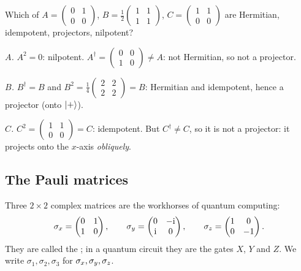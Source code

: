 \begin{example}\label{ex:special}
  Which of $A=\begin{pmatrix}0&1\\0&0\end{pmatrix}$, $B=\tfrac12\begin{pmatrix}1&1\\1&1\end{pmatrix}$, $C=\begin{pmatrix}1&1\\0&0\end{pmatrix}$ are Hermitian, idempotent, projectors, nilpotent?
\end{example}
\begin{solution}
  \begin{steps}
    \item \emph{$A$.} $A^2=0$: nilpotent. $A^\dagger=\begin{pmatrix}0&0\\1&0\end{pmatrix}\neq A$: not Hermitian, so not a projector.
    \item \emph{$B$.} $B^\dagger=B$ and $B^2=\tfrac14\begin{pmatrix}2&2\\2&2\end{pmatrix}=B$: Hermitian and idempotent, hence a projector (onto $\left|+\right\rangle$).
    \item \emph{$C$.} $C^2=\begin{pmatrix}1&1\\0&0\end{pmatrix}=C$: idempotent. But $C^\dagger\neq C$, so it is not a projector: it projects onto the $x$-axis \emph{obliquely}.
  \end{steps}
\end{solution}

\subsection{The Pauli matrices}

Three $2\times2$ complex matrices are the workhorses of quantum computing:
\[
  \sigma_x=\begin{pmatrix}0&1\\1&0\end{pmatrix},\qquad \sigma_y=\begin{pmatrix}0&-\mathrm{i}\\\mathrm{i}&0\end{pmatrix},\qquad \sigma_z=\begin{pmatrix}1&0\\0&-1\end{pmatrix}.
\]
They are called the ; in a quantum circuit they are the gates $X$, $Y$ and $Z$. We write $\sigma_1,\sigma_2,\sigma_3$ for $\sigma_x,\sigma_y,\sigma_z$.

